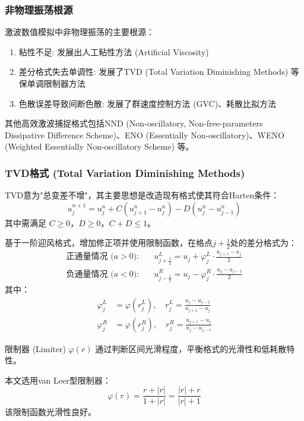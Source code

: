 \documentclass[12pt,a4paper]{article}
\begin{document}
\subsubsection{非物理振荡根源}
激波数值模拟中非物理振荡的主要根源：
\begin{enumerate}
    \item 粘性不足: 发展出人工粘性方法 (Artificial Viscosity)
    \item 差分格式失去单调性: 发展了TVD (Total Variation Diminishing Methods) 等保单调限制器方法
    \item 色散误差导致间断色散: 发展了群速度控制方法 (GVC)、耗散比拟方法
\end{enumerate}
其他高效激波捕捉格式包括NND (Non-oscillatory, Non-free-parameters Dissipative Difference Scheme)、ENO (Essentially Non-oscillatory)、WENO (Weighted Essentially Non-oscillatory Scheme) 等。

\subsubsection{TVD格式 (Total Variation Diminishing Methods)}
TVD意为"总变差不增"，其主要思想是改造现有格式使其符合Harten条件：
\begin{equation}
u_{j}^{n+1} = u_{j}^{n} + C(u_{j+1}^{n} - u_{j}^{n}) - D(u_{j}^{n} - u_{j-1}^{n})
\end{equation}
其中需满足 $C \geq 0$，$D \geq 0$，$C + D \leq 1$。

基于一阶迎风格式，增加修正项并使用限制函数，在格点$j+\frac{1}{2}$处的差分格式为：
\begin{align}
\text{正通量情况 ($a > 0$):} \quad & u_{j+\frac{1}{2}}^{L} = u_{j} + \varphi_{j}^{L} \cdot \frac{u_{j+1} - u_{j}}{2} \\
\text{负通量情况 ($a < 0$):} \quad & u_{j-\frac{1}{2}}^{R} = u_{j} - \varphi_{j}^{R} \cdot \frac{u_{j} - u_{j-1}}{2}
\end{align}
其中：
\begin{align*}
\varphi_{j}^{L} &= \varphi(r_{j}^{L}), \quad r_{j}^{L} = \frac{u_{j} - u_{j-1}}{u_{j+1} - u_{j}} \\
\varphi_{j}^{R} &= \varphi(r_{j}^{R}), \quad r_{j}^{R} = \frac{u_{j+1} - u_{j}}{u_{j} - u_{j-1}}
\end{align*}

限制器 (Limiter) $\varphi(r)$ 通过判断区间光滑程度，平衡格式的光滑性和低耗散特性。

本文选用van Leer型限制器：
\begin{equation}
\varphi(r) = \frac{r + |r|}{1 + |r|} = \frac{|r| + r}{|r| + 1}
\end{equation}
该限制函数光滑性良好。
\end{document}
